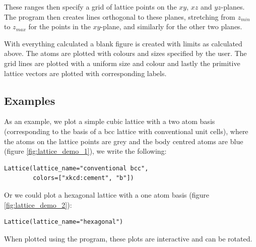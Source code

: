 \documentclass[main.tex]{subfiles}
\begin{document}
	These ranges then specify a grid of lattice points on the $ xy$, $ xz $ and $ yz $-planes. The program then creates lines orthogonal to these planes, stretching from $ z_{min} $ to $ z_{max} $ for the points in the $ xy $-plane, and similarly for the other two planes.
	
	With everything calculated a blank figure is created with limits as calculated above. The atoms are plotted with colours and sizes specified by the user. The grid lines are plotted with a uniform size and colour and lastly the primitive lattice vectors are plotted with corresponding labels.
	
	\subsection{Examples}
	As an example, we plot a simple cubic lattice with a two atom basis (corresponding to the basis of a bcc lattice with conventional unit cells), where the atoms on the lattice points are grey and the body centred atoms are blue (figure \ref{fig:lattice_demo_1}), we write the following:
\begin{lstlisting}
Lattice(lattice_name="conventional bcc",
		colors=["xkcd:cement", "b"])
\end{lstlisting}
	Or we could plot a hexagonal lattice with a one atom basis (figure \ref{fig:lattice_demo_2}):
\begin{lstlisting}
Lattice(lattice_name="hexagonal")
\end{lstlisting}
	When plotted using the program, these plots are interactive and can be rotated.
\end{document}
